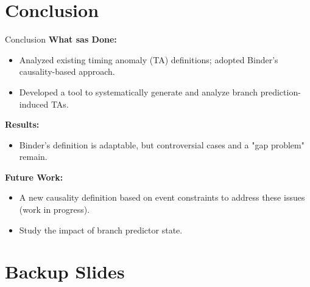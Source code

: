 \documentclass{beamer}
\begin{document}


\section{Conclusion}

\begin{frame}[label=current]{Conclusion}
    \textbf{What sas Done:}
    \begin{itemize}
        \item Analyzed existing timing anomaly (TA) definitions; adopted Binder's causality-based approach.
        \item Developed a tool to systematically generate and analyze branch prediction-induced TAs.
    \end{itemize}

    \textbf{Results:}
    \begin{itemize}
        \item Binder's definition is adaptable, but controversial cases and a "gap problem" remain.
    \end{itemize}

    \textbf{Future Work:}
    \begin{itemize}
        \item A new causality definition based on event constraints to address these issues (work in progress).
        \item Study the impact of branch predictor state.
    \end{itemize}


\end{frame}

\section*{Backup Slides}
\end{document}
